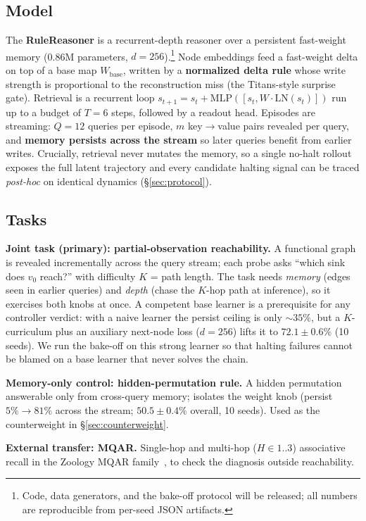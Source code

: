 \documentclass{article}
\begin{document}
\subsection{Model}\label{sec:model}
The \textbf{RuleReasoner} is a recurrent-depth reasoner over a persistent
fast-weight memory (0.86M parameters, $d{=}256$).\footnote{Code, data
generators, and the bake-off protocol will be released; all numbers are
reproducible from per-seed JSON artifacts.} Node embeddings feed a fast-weight
delta on top of a base map $W_{\text{base}}$, written by a \textbf{normalized
delta rule} whose write strength is proportional to the reconstruction miss
(the Titans-style surprise gate). Retrieval is a recurrent loop
$s_{t+1} = s_t + \mathrm{MLP}([s_t, W \cdot \mathrm{LN}(s_t)])$
run up to a budget of $T{=}6$ steps, followed by a readout head. Episodes are
streaming: $Q{=}12$ queries per episode, $m$ key$\to$value pairs revealed per
query, and \textbf{memory persists across the stream} so later queries benefit
from earlier writes. Crucially, retrieval never mutates the memory, so a single
no-halt rollout exposes the full latent trajectory and every candidate halting
signal can be traced \emph{post-hoc} on identical dynamics
(\S\ref{sec:protocol}).

\subsection{Tasks}\label{sec:tasks}
\textbf{Joint task (primary): partial-observation reachability.} A functional
graph is revealed incrementally across the query stream; each probe asks
``which sink does $v_0$ reach?'' with difficulty $K$ = path length. The task
needs \emph{memory} (edges seen in earlier queries) and \emph{depth} (chase the
$K$-hop path at inference), so it exercises both knobs at once. A competent
base learner is a prerequisite for any controller verdict: with a naive learner
the persist ceiling is only ${\sim}35\%$, but a $K$-curriculum plus an
auxiliary next-node loss ($d{=}256$) lifts it to $72.1\pm0.6\%$ (10 seeds). We
run the bake-off on this strong learner so that halting failures cannot be
blamed on a base learner that never solves the chain.

\textbf{Memory-only control: hidden-permutation rule.} A hidden permutation
answerable only from cross-query memory; isolates the weight knob (persist
$5\%\to81\%$ across the stream; $50.5\pm0.4\%$ overall, 10 seeds). Used as the
counterweight in \S\ref{sec:counterweight}.

\textbf{External transfer: MQAR.} Single-hop and multi-hop ($H\in1..3$)
associative recall in the Zoology MQAR family~\citep{arora2023zoology}, to
check the diagnosis outside reachability.
\end{document}
